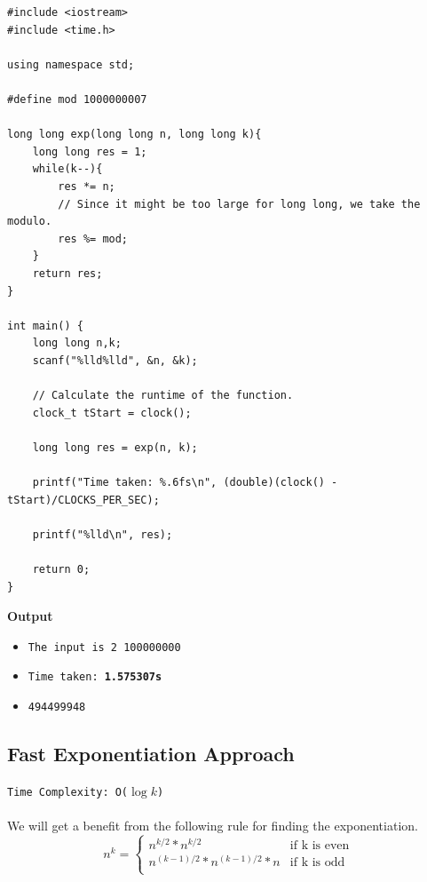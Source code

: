 \documentclass[12pt]{article}
\begin{document}
\begin{verbatim}
#include <iostream>
#include <time.h>

using namespace std;

#define mod 1000000007

long long exp(long long n, long long k){
    long long res = 1;
    while(k--){
        res *= n;
        // Since it might be too large for long long, we take the modulo.
        res %= mod;
    }
    return res;
}

int main() {
    long long n,k;
    scanf("%lld%lld", &n, &k);
    
    // Calculate the runtime of the function.
    clock_t tStart = clock();
    
    long long res = exp(n, k);
    
    printf("Time taken: %.6fs\n", (double)(clock() - tStart)/CLOCKS_PER_SEC);
    
    printf("%lld\n", res);
    
    return 0;
}

\end{verbatim}
\textbf{Output}

\begin{itemize}
  \item \texttt{The input is 2 100000000} 
  \item \texttt{Time taken: \textbf{1.575307s}} 
  \item \texttt{494499948}
\end{itemize}

\clearpage

\subsection{Fast Exponentiation Approach }
\texttt{Time Complexity: O($\log{k}$) } \\ \\
We will get a benefit from the following rule for finding the exponentiation.
\begin{equation}
  n^k =
  \begin{cases}
    n^{k/2} * n^{k/2} & \text{if k is even } \\
    n^{(k-1)/2} * n^{(k-1)/2} * n & \text{if k is odd } \\
  \end{cases}
\end{equation}
\end{document}
